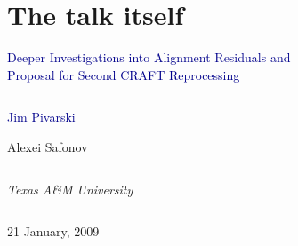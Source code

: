 \documentclass[compress]{beamer}
\begin{document}
\section*{The talk itself}

\begin{frame}
\vfill
\begin{center}
\textcolor{darkblue}{\Large Deeper Investigations into Alignment Residuals and \\ \vspace{0.3 cm} Proposal for Second CRAFT Reprocessing}

\vfill
\begin{columns}
\begin{center}
\large
\textcolor{darkblue}{Jim Pivarski}

\vspace{0.2 cm}
Alexei Safonov
\end{center}
\end{columns}

\begin{columns}
\begin{center}
\scriptsize
{\it Texas A\&M University}
\end{center}
\end{columns}

\vfill
21 January, 2009

\end{center}
\end{frame}


\small

\end{document}
